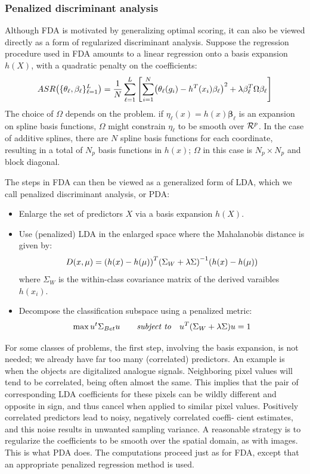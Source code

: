 \documentclass[12pt, letterpaper]{article}
\theoremstyle{definition}
\newcommand{\be}{\mathbf{\beta}}
\DeclarePairedDelimiter\autobracket{(}{)}
\newcommand{\br}[1]{\autobracket*{#1}}
\begin{document}
\subsubsection{Penalized discriminant analysis}
Although FDA is motivated by generalizing optimal scoring, it can also be viewed directly as a form of regularized discriminant analysis. Suppose the regression procedure used in FDA amounts to a linear regression onto a basis expansion $h(X)$, with a quadratic penalty on the coefficients:
\begin{equation}
ASR\br{\{ \theta_\ell, \be_\ell\}_{\ell=1}^L} = \frac{1}{N}\sum_{\ell=1}^L\left[\sum_{i=1}^N \br{\theta_\ell(g_i) - h^T(x_i)\be_\ell}^2 + \lambda \be_\ell^T\Omega \be_\ell\right]
\end{equation}
The choice of $\Omega$ depends on the problem. if $\eta_\ell(x) = h(x)\be_\ell$ is an expansion on spline basis functions, $\Omega$ might constrain $\eta_\ell$ to be smooth over $\CMcal{R}^p$. In the case of additive splines, there are $N$ spline basis functions for each coordinate, resulting in a total of $N_p$ basis functions in $h(x)$; $\Omega$ in this case is $N_p \times N_p$ and block diagonal.

The steps in FDA can then be viewed as a generalized form of LDA, which we call penalized discriminant analysis, or PDA:
\begin{itemize}
\item Enlarge the set of predictors $X$ via a basis expansion $h(X)$.
\item Use (penalized) LDA in the enlarged space where the Mahalanobis distance is given by:
\begin{equation}
D(x, \mu) = \br{h(x) - h(\mu)}^T\br{\Sigma_W+\lambda\Sigma}^{-1} \br{h(x) - h(\mu)}
\end{equation}
where $\Sigma_W$ is the within-class covariance matrix of the derived varaibles $h(x_i)$.
\item Decompose the classification subspace using a penalized metric:
\begin{equation}
\max u^t\Sigma_{Bet}u \quad\quad \textit{subject to} \quad u^T\br{\Sigma_W+\lambda\Sigma}u =1
\end{equation}
\end{itemize}
For some classes of problems, the first step, involving the basis expansion, is not needed; we already have far too many (correlated) predictors. An example is when the objects are digitalized analogue signals. Neighboring pixel values will tend to be correlated, being often almost the same. This implies that the pair of corresponding LDA coefficients for these pixels can be wildly different and opposite in sign, and thus cancel when applied to similar pixel values. Positively correlated predictors lead to noisy, negatively correlated coeffi- cient estimates, and this noise results in unwanted sampling variance. A reasonable strategy is to regularize the coefficients to be smooth over the spatial domain, as with images. This is what PDA does. The computations proceed just as for FDA, except that an appropriate penalized regression method is used.
\end{document}
